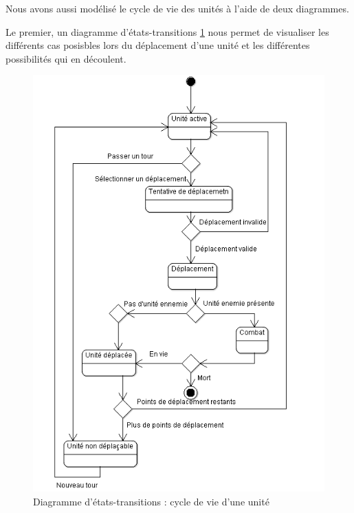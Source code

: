 Nous avons aussi modélisé le cycle de vie des unités à l'aide de deux diagrammes.

Le premier, un diagramme d'états-transitions \ref{fig:CycleVieUnite} nous permet de visualiser les différents cas posisbles lors du déplacement d'une unité et les différentes possibilités qui en découlent.
\begin{figure}[!h]
\centering
\includegraphics[width=\textwidth]{Parties/Images/CycleVieUnite.png}
\caption{Diagramme d'états-transitions : cycle de vie d'une unité}
\label{fig:CycleVieUnite}
\end{figure}

